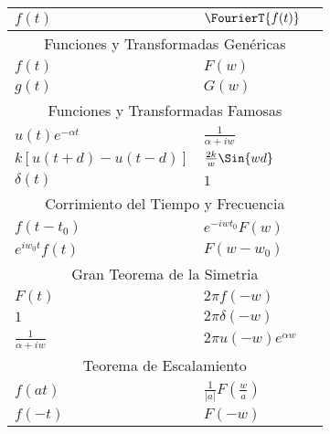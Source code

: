 \begin{table}[ht]
    \begin{tabular}{|m{16em}|m{16em}|@{}m{0pt}@{}}
        \hline
        \large{$f(t)$}          & \large{$\FourierT{f(t)}$}         &\\[2em]    \hline\hline
        
        \multicolumn{3}{|c|}{Funciones y Transformadas Genéricas}   \\          \hline
        $f(t)$                  & $F(w)$                            &\\[1em]    \hline
        $g(t)$                  & $G(w)$                            &\\[1em]    \hline\hline

        \multicolumn{3}{|c|}{Funciones y Transformadas Famosas}     \\          \hline
        $u(t)e^{-\alpha t}$     & $\frac{1}{\alpha + iw}$           &\\[1em]    \hline
        $k[u(t+d) -u(t-d)]$     & $\frac{2k}{w} \Sin{wd}$           &\\[1em]    \hline
        $\delta(t)        $     & $1                    $           &\\[1em]    \hline\hline

        \multicolumn{3}{|c|}{Corrimiento del Tiempo y Frecuencia}   \\          \hline
        $f(t - t_0)       $     & $e^{-iwt_0} F(w)       $          &\\[1em]    \hline
        $e^{iw_0t} f(t)   $     & $F(w - w_0)            $          &\\[1em]    \hline\hline

        \multicolumn{3}{|c|}{Gran Teorema de la Simetria}          \\           \hline
        $F(t)             $     & $2\pi f(-w)             $        &\\[1em]     \hline\hline
        $1                $     & $2\pi \delta(-w)        $        &\\[1em]     \hline\hline
        $\frac{1}{\alpha + iw}$ & $2\pi u(-w) e^{\alpha w}$        &\\[1em]     \hline\hline

        \multicolumn{3}{|c|}{Teorema de Escalamiento}               \\          \hline
        $f(at)            $     & $\frac{1}{|a|} F(\frac{w}{a})$   &\\[1em]     \hline
        $f(-t)            $     & $F(-w)$                          &\\[1em]     \hline
    \end{tabular}
\end{table}







